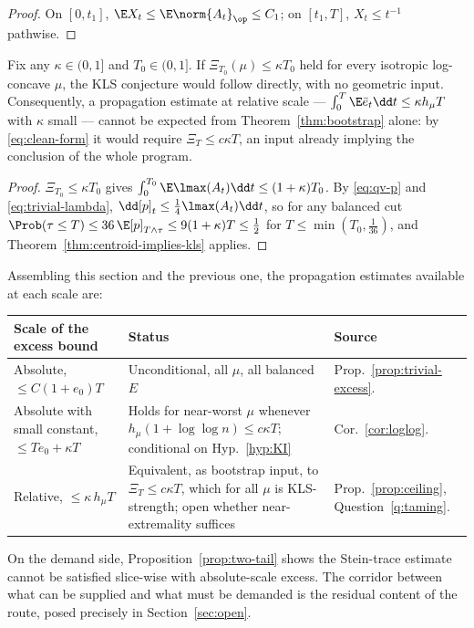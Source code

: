 \documentclass[../../main.tex]{subfiles}
\begin{document}
\begin{proof}
On $[0,t_1]$, $\E X_t\le\E\norm{A_t}_\op\le C_1$; on $[t_1,T]$, $X_t\le t^{-1}$ pathwise.
\end{proof}

\begin{proposition}
\label{prop:ceiling}
Fix any $\kappa\in(0,1]$ and $T_0\in(0,1]$. If $\Xi_{T_0}(\mu)\le\kappa T_0$ held for every
isotropic log-concave $\mu$, the KLS conjecture would follow directly, with no geometric input.
Consequently, a propagation estimate at relative scale ---
$\int_0^T\E\bar e_t\dd t\le\kappa h_\mu T$ with $\kappa$ small --- cannot be expected from
Theorem~\ref{thm:bootstrap} alone: by \eqref{eq:clean-form} it would require
$\Xi_T\le c\kappa T$, an input already implying the conclusion of the whole program.
\end{proposition}

\begin{proof}
$\Xi_{T_0}\le\kappa T_0$ gives $\int_0^{T_0}\E\lmax(A_t)\dd t\le(1+\kappa)T_0$. By
\eqref{eq:qv-p} and \eqref{eq:trivial-lambda}, $\dd[p]_t\le\tfrac14\lmax(A_t)\dd t$, so for any
balanced cut $\Prob(\tau\le T)\le36\,\E[p]_{T\wedge\tau}\le9(1+\kappa)T\le\tfrac12$ for
$T\le\min(T_0,\tfrac1{36})$, and Theorem~\ref{thm:centroid-implies-kls} applies.
\end{proof}

\begin{remark}
\label{rem:supply}
Assembling this section and the previous one, the propagation estimates available at each scale
are:
\begin{center}
\begin{tabularx}{\textwidth}{@{}>{\raggedright\arraybackslash}p{}>{\raggedright\arraybackslash}p{}Y@{}}
\toprule
Scale of the excess bound & Status & Source \\
\midrule
Absolute, $\le C(1+e_0)T$ & Unconditional, all $\mu$, all balanced $E$ &
Prop.~\ref{prop:trivial-excess}. \\
\addlinespace
Absolute with small constant, $\le Te_0+\kappa T$ & Holds for near-worst $\mu$ whenever
$h_\mu(1+\log\log n)\le c\kappa T$; conditional on Hyp.~\ref{hyp:KI} &
Cor.~\ref{cor:loglog}. \\
\addlinespace
Relative, $\le\kappa\,h_\mu T$ & Equivalent, as bootstrap input, to $\Xi_T\le c\kappa T$,
which for all $\mu$ is KLS-strength; open whether near-extremality suffices &
Prop.~\ref{prop:ceiling}, Question~\ref{q:taming}. \\
\bottomrule
\end{tabularx}
\end{center}
On the demand side, Proposition~\ref{prop:two-tail} shows the Stein-trace estimate cannot be
satisfied slice-wise with absolute-scale excess. The corridor between what can be supplied and
what must be demanded is the residual content of the route, posed precisely in
Section~\ref{sec:open}.
\end{remark}
\end{document}
